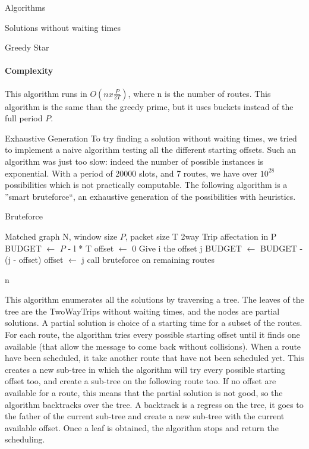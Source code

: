 \documentclass[a4paper,10pt]{report}
\begin{document}
\begin{chapter}{Algorithms}
\begin{section}{Solutions without waiting times}
\begin{subsection}{Greedy Star}
\paragraph{Complexity}
This algorithm runs in $O(n x \frac{P}{2T})$, where n is the number of routes.
This algorithm is the same than the greedy prime, but it uses buckets instead of the full period $P$.
\end{subsection}


\begin{subsection}{Exhaustive Generation}
 To try finding a solution without waiting times, we tried to implement a naive algorithm testing all the different starting offsets.
 Such an algorithm was just too slow: indeed the number of possible instances is exponential. With a period of 20000 slots,
 and 7 routes, we have over $10^{28}$ possibilities which is not practically computable.
 The following algorithm is a ''smart bruteforce``, an exhaustive generation of the possibilities with heuristics.
 
\begin{algorithm}[H]
\caption{Bruteforce}
\begin{algorithmic}
\REQUIRE Matched graph N, window size $P$, packet size T
\ENSURE 2way Trip affectation in P
\STATE BUDGET $\leftarrow$ $P$ - l * T
\STATE offset $\leftarrow$ 0
\STATE Give i the offset j
\STATE BUDGET $\leftarrow$ BUDGET - (j - offset)
\STATE offset $\leftarrow$ j
\STATE call bruteforce on remaining routes
\ENDIF
\ENDFOR
\ENDFOR


\end{algorithmic}
\end{algorithm}n

This algorithm enumerates all the solutions by traversing a tree. The leaves of the tree are 
the TwoWayTrips without waiting times, and the nodes are partial solutions. A partial solution is choice of a starting time for a subset of the routes.
For each route, the algorithm tries every possible starting offset until it finds one available (that allow the message to come back without collisions). When a route have been scheduled, it take another route that have not been scheduled yet.
This creates a new sub-tree in which the algorithm will try every possible starting offset too, and create a sub-tree on the following route too.
If no offset are available for a route, this means that the partial solution is not good, so the algorithm backtracks over the tree.
A backtrack is a regress on the tree, it goes to the father of the current sub-tree and create a new sub-tree with the current available offset.
Once a leaf is obtained, the algorithm stops and return the scheduling.


\end{subsection}
\end{section}
\end{chapter}
\end{document}
